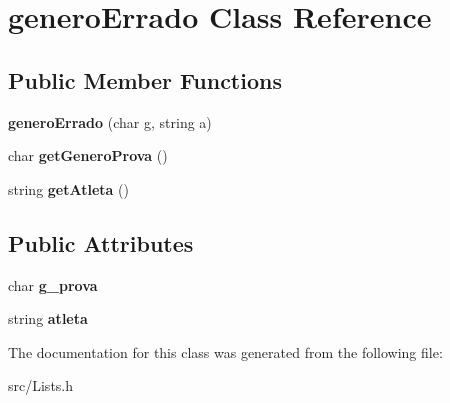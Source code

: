 \hypertarget{classgenero_errado}{}\section{genero\+Errado Class Reference}
\label{classgenero_errado}
\subsection*{Public Member Functions}
\begin{DoxyCompactItemize}
\item 
\hypertarget{classgenero_errado_a7fdd7215bd2408b56d91cec5c3946a22}{}{\bfseries genero\+Errado} (char g, string a)\label{classgenero_errado_a7fdd7215bd2408b56d91cec5c3946a22}

\item 
\hypertarget{classgenero_errado_abe41b612a436b555232683c0e02760b6}{}char {\bfseries get\+Genero\+Prova} ()\label{classgenero_errado_abe41b612a436b555232683c0e02760b6}

\item 
\hypertarget{classgenero_errado_af12c50104ef03688d2154ed9747e7fa3}{}string {\bfseries get\+Atleta} ()\label{classgenero_errado_af12c50104ef03688d2154ed9747e7fa3}

\end{DoxyCompactItemize}
\subsection*{Public Attributes}
\begin{DoxyCompactItemize}
\item 
\hypertarget{classgenero_errado_ac1195ba98ae31bf95409a122a13b3cd9}{}char {\bfseries g\+\_\+prova}\label{classgenero_errado_ac1195ba98ae31bf95409a122a13b3cd9}

\item 
\hypertarget{classgenero_errado_a07f2a2a8257a5a6831dbfe2e2ee5b902}{}string {\bfseries atleta}\label{classgenero_errado_a07f2a2a8257a5a6831dbfe2e2ee5b902}

\end{DoxyCompactItemize}


The documentation for this class was generated from the following file\+:\begin{DoxyCompactItemize}
\item 
src/Lists.\+h\end{DoxyCompactItemize}

